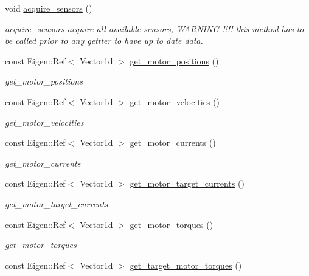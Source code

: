 \begin{DoxyCompactItemize}
void \hyperlink{classblmc__robots_1_1SingleMotor_adbc3fb18b62ee085ff2d4d6bb2f107a4}{acquire\+\_\+sensors} ()
\begin{DoxyCompactList}\small\item\em acquire\+\_\+sensors acquire all available sensors, W\+A\+R\+N\+I\+NG !!!! this method has to be called prior to any gettter to have up to date data. \end{DoxyCompactList}\item 
const Eigen\+::\+Ref$<$ Vector1d $>$ \hyperlink{classblmc__robots_1_1SingleMotor_ac72b1daab642097f739ccdcb8388d6c9}{get\+\_\+motor\+\_\+positions} ()
\begin{DoxyCompactList}\small\item\em get\+\_\+motor\+\_\+positions \end{DoxyCompactList}\item 
const Eigen\+::\+Ref$<$ Vector1d $>$ \hyperlink{classblmc__robots_1_1SingleMotor_a8ee1b2b7d9b5bf83cd43511836e6074a}{get\+\_\+motor\+\_\+velocities} ()
\begin{DoxyCompactList}\small\item\em get\+\_\+motor\+\_\+velocities \end{DoxyCompactList}\item 
const Eigen\+::\+Ref$<$ Vector1d $>$ \hyperlink{classblmc__robots_1_1SingleMotor_ab3330ea642ca97c094f2af7b50a7a747}{get\+\_\+motor\+\_\+currents} ()
\begin{DoxyCompactList}\small\item\em get\+\_\+motor\+\_\+currents \end{DoxyCompactList}\item 
const Eigen\+::\+Ref$<$ Vector1d $>$ \hyperlink{classblmc__robots_1_1SingleMotor_af48038f9bc14cb4971d3f1aa54573daf}{get\+\_\+motor\+\_\+target\+\_\+currents} ()
\begin{DoxyCompactList}\small\item\em get\+\_\+motor\+\_\+target\+\_\+currents \end{DoxyCompactList}\item 
const Eigen\+::\+Ref$<$ Vector1d $>$ \hyperlink{classblmc__robots_1_1SingleMotor_a375565046712276a1f3bd941078a44fb}{get\+\_\+motor\+\_\+torques} ()
\begin{DoxyCompactList}\small\item\em get\+\_\+motor\+\_\+torques \end{DoxyCompactList}\item 
const Eigen\+::\+Ref$<$ Vector1d $>$ \hyperlink{classblmc__robots_1_1SingleMotor_a5fe1f45ebb4893b1b31e1f0f23fb48e2}{get\+\_\+target\+\_\+motor\+\_\+torques} ()

\end{DoxyCompactItemize}
